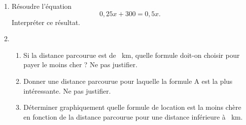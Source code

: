 \begin{act}
\begin{enumerate}[resume]
\item Résoudre l'équation 
\[0,25x + 300 = 0,5x.\]
 Interpréter ce résultat.
\item 
	\begin{enumerate}
		\item Si la distance parcourue est de ~km, quelle formule doit-on choisir pour payer le moins cher ? Ne pas justifier.
		\item Donner une distance parcourue pour laquelle la formule A est la plus intéressante. Ne pas justifier.
		\item Déterminer graphiquement quelle formule de location est la moins chère en fonction de la distance parcourue pour une distance inférieure à ~km.
	\end{enumerate}
\end{enumerate}
\end{act}

